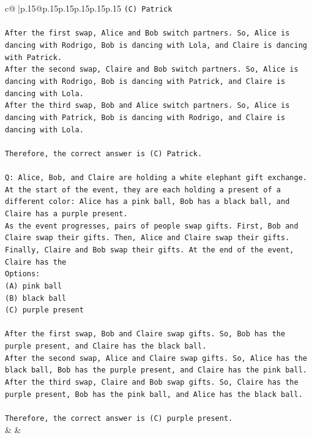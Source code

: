 \documentclass{article}
\begin{document}
{\begin{supertabular}{c@{$\;$}|p{.15\linewidth}@{}p{.15\linewidth}p{.15\linewidth}p{.15\linewidth}p{.15\linewidth}p{.15\linewidth}}
{{{\texttt{(C) Patrick} \\
\\ 
\texttt{After the first swap, Alice and Bob switch partners. So, Alice is dancing with Rodrigo, Bob is dancing with Lola, and Claire is dancing with Patrick.} \\
\texttt{After the second swap, Claire and Bob switch partners. So, Alice is dancing with Rodrigo, Bob is dancing with Patrick, and Claire is dancing with Lola.} \\
\texttt{After the third swap, Bob and Alice switch partners. So, Alice is dancing with Patrick, Bob is dancing with Rodrigo, and Claire is dancing with Lola.} \\
\\ 
\texttt{Therefore, the correct answer is (C) Patrick.} \\
\\ 
\texttt{Q: Alice, Bob, and Claire are holding a white elephant gift exchange. At the start of the event, they are each holding a present of a different color: Alice has a pink ball, Bob has a black ball, and Claire has a purple present.} \\
\texttt{As the event progresses, pairs of people swap gifts. First, Bob and Claire swap their gifts. Then, Alice and Claire swap their gifts. Finally, Claire and Bob swap their gifts. At the end of the event, Claire has the} \\
\texttt{Options:} \\
\texttt{(A) pink ball} \\
\texttt{(B) black ball} \\
\texttt{(C) purple present} \\
\\ 
\texttt{After the first swap, Bob and Claire swap gifts. So, Bob has the purple present, and Claire has the black ball.} \\
\texttt{After the second swap, Alice and Claire swap gifts. So, Alice has the black ball, Bob has the purple present, and Claire has the pink ball.} \\
\texttt{After the third swap, Claire and Bob swap gifts. So, Claire has the purple present, Bob has the pink ball, and Alice has the black ball.} \\
\\ 
\texttt{Therefore, the correct answer is (C) purple present.} \\
            }
        }
    }
    & & \\ \\


\end{supertabular}}
\end{document}
